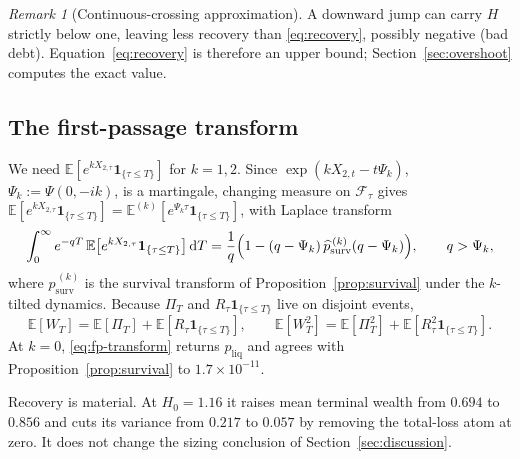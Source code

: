 \documentclass[11pt]{article}
\newcommand{\E}{\mathbb{E}}
\newcommand{\diff}{\mathrm{d}}
\newcommand{\F}{\mathcal{F}}
\newcommand{\one}{\mathbf{1}}
\theoremstyle{plain}
\theoremstyle{definition}
\theoremstyle{remark}
\newtheorem{remark}{Remark}
\begin{document}
\begin{remark}[Continuous-crossing approximation]\label{rem:overshoot}
A downward jump can carry $H$ strictly below one, leaving less recovery than \eqref{eq:recovery},
possibly negative (bad debt). Equation~\eqref{eq:recovery} is therefore an upper bound;
Section~\ref{sec:overshoot} computes the exact value.
\end{remark}

\subsection{The first-passage transform}
We need $\E[e^{kX_{2,\tau}}\one_{\{\tau\le T\}}]$ for $k=1,2$. Since
$\exp(kX_{2,t}-t\Psi_k)$, $\Psi_k:=\Psi(0,-ik)$, is a martingale, changing measure on $\F_\tau$
gives $\E[e^{kX_{2,\tau}}\one_{\{\tau\le T\}}]=\E^{(k)}[e^{\Psi_k\tau}\one_{\{\tau\le T\}}]$, with
Laplace transform
\begin{equation}\label{eq:fp-transform}
\int_0^\infty e^{-qT}\,\E\!\left[e^{kX_{2,\tau}}\one_{\{\tau\le T\}}\right]\diff T
=\frac{1}{q}\Bigl(1-(q-\Psi_k)\,\widehat p^{\,(k)}_{\mathrm{surv}}(q-\Psi_k)\Bigr),
\qquad q>\Psi_k,
\end{equation}
where $\widehat p^{\,(k)}_{\mathrm{surv}}$ is the survival transform of
Proposition~\ref{prop:survival} under the $k$-tilted dynamics. Because $\Pi_T$ and
$R_\tau\one_{\{\tau\le T\}}$ live on disjoint events,
\begin{equation}\label{eq:wealth-moments}
\E[W_T]=\E[\Pi_T]+\E[R_\tau\one_{\{\tau\le T\}}],
\qquad
\E[W_T^2]=\E[\Pi_T^2]+\E[R_\tau^2\one_{\{\tau\le T\}}].
\end{equation}
At $k=0$, \eqref{eq:fp-transform} returns $p_{\mathrm{liq}}$ and agrees with
Proposition~\ref{prop:survival} to $1.7\times10^{-11}$.

Recovery is material. At $H_0=1.16$ it raises mean terminal wealth from $0.694$ to $0.856$ and cuts
its variance from $0.217$ to $0.057$ by removing the total-loss atom at zero. It does not change the
sizing conclusion of Section~\ref{sec:discussion}.
\end{document}
